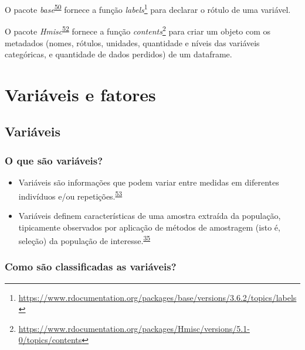 \documentclass[
  a4paper,
]{book}
\renewcommand{\href}[2]{#2\footnote{\url{#1}}}
\newenvironment{infobox}[1]
  {
  \begin{itemize}
  \renewcommand{\labelitemi}{
    \raisebox{-.7\height}[0pt][0pt]{
      {\setkeys{Gin}{width=3em,keepaspectratio}
        \texttt{[image: \#1]}}
    }
  }
  \setlength{\fboxsep}{1em}
  \begin{blackbox}
  \item
  }
  {
  \end{blackbox}
  \end{itemize}
  }
\begin{document}
\begin{infobox}{images/Rlogo}
O pacote \emph{base}\textsuperscript{\protect\hyperlink{ref-base-3}{50}} fornece a função \href{https://www.rdocumentation.org/packages/base/versions/3.6.2/topics/labels}{\emph{labels}} para declarar o rótulo de uma variável.

\end{infobox}

\begin{infobox}{images/Rlogo}
O pacote \emph{Hmisc}\textsuperscript{\protect\hyperlink{ref-Hmisc}{52}} fornece a função \href{https://www.rdocumentation.org/packages/Hmisc/versions/5.1-0/topics/contents}{\emph{contents}} para criar um objeto com os metadados (nomes, rótulos, unidades, quantidade e níveis das variáveis categóricas, e quantidade de dados perdidos) de um dataframe.

\end{infobox}

\hypertarget{variaveis-fatores}{%
\chapter{\texorpdfstring{\textbf{Variáveis e fatores}}{Variáveis e fatores}}\label{variaveis-fatores}}

\hypertarget{variaveis}{%
\section{Variáveis}\label{variaveis}}

\hypertarget{o-que-suxe3o-variuxe1veis}{%
\subsection{O que são variáveis?}\label{o-que-suxe3o-variuxe1veis}}

\begin{itemize}
\item
  Variáveis são informações que podem variar entre medidas em diferentes indivíduos e/ou repetições.\textsuperscript{\protect\hyperlink{ref-Altman1999}{53}}
\item
  Variáveis definem características de uma amostra extraída da população, tipicamente observados por aplicação de métodos de amostragem (isto é, seleção) da população de interesse.\textsuperscript{\protect\hyperlink{ref-vetter2017}{35}}
\end{itemize}

\hypertarget{como-suxe3o-classificadas-as-variuxe1veis}{%
\subsection{Como são classificadas as variáveis?}\label{como-suxe3o-classificadas-as-variuxe1veis}}
\end{document}
